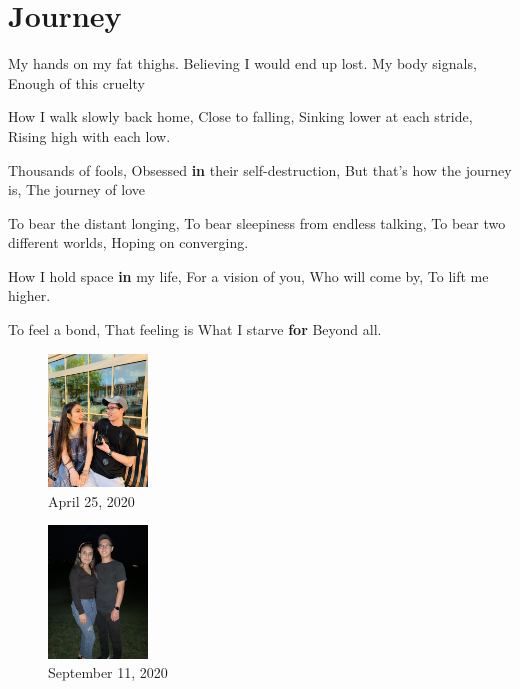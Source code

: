 \documentclass[
]{book}
\newenvironment{Shaded}{\begin{snugshade}}{\end{snugshade}}
\newcommand{\ControlFlowTok}[1]{\textcolor[rgb]{0.13,0.29,0.53}{\textbf{#1}}}
\newcommand{\NormalTok}[1]{#1}
\newcommand{\SpecialCharTok}[1]{\textcolor[rgb]{0.00,0.00,0.00}{#1}}
\begin{document}
\hypertarget{journey}{%
\chapter{Journey}\label{journey}}

\begin{Shaded}
\begin{Highlighting}[]
\NormalTok{My hands on my fat thighs.}
\NormalTok{Believing I would end up lost.}
\NormalTok{My body signals,}
\NormalTok{Enough of this cruelty }

\NormalTok{How I walk slowly back home,}
\NormalTok{Close to falling,}
\NormalTok{Sinking lower at each stride,}
\NormalTok{Rising high with each low.}

\NormalTok{Thousands of fools,}
\NormalTok{Obsessed }\ControlFlowTok{in}\NormalTok{ their self}\SpecialCharTok{{-}}\NormalTok{destruction,}
\NormalTok{But that’s how the journey is,}
\NormalTok{The journey of love}

\NormalTok{To bear the distant longing,}
\NormalTok{To bear sleepiness from endless talking,}
\NormalTok{To bear two different worlds,}
\NormalTok{Hoping on converging.}

\NormalTok{How I hold space }\ControlFlowTok{in}\NormalTok{ my life,}
\NormalTok{For a vision of you,}
\NormalTok{Who will come by,}
\NormalTok{To lift me higher.}

\NormalTok{To feel a bond,}
\NormalTok{That feeling is }
\NormalTok{What I starve }\ControlFlowTok{for}
\NormalTok{Beyond all.}
\end{Highlighting}
\end{Shaded}

\begin{figure}
\centering
\includegraphics[width=1.04167in,height=\textheight]{mimages/0.1 4-25-2020.jpg}
\caption{April 25, 2020}
\end{figure}

\begin{figure}
\centering
\includegraphics[width=1.04167in,height=\textheight]{mimages/3 9-11-2020.jpg}
\caption{September 11, 2020}
\end{figure}
\end{document}
